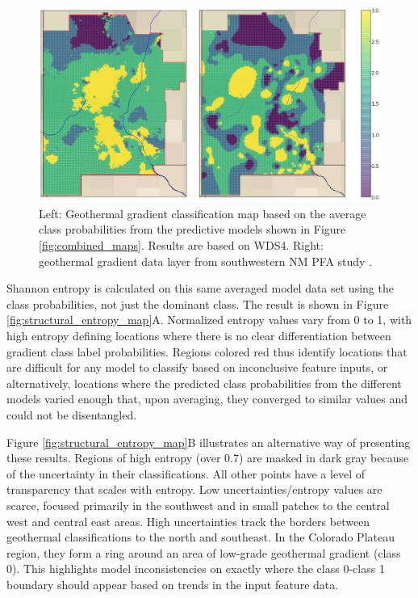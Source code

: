 \begin{figure}[!htp]
\centering
\includegraphics[width=\textwidth]{templates/images/Figure-Average_Gradient_Map_Joint.png}
\caption[Probability-averaged prediction map]{Left: Geothermal gradient classification map based on the average class probabilities from the predictive models shown in Figure \ref{fig:combined_maps}. Results are based on WDS4. Right: geothermal gradient data layer from southwestern NM PFA study \protect\citep{bielicki_hydrogeolgic_2015}.}
\label{fig:avg_final_map}
\end{figure}

Shannon entropy is calculated on this same averaged model data set using the class probabilities, not just the dominant class. The result is shown in Figure \ref{fig:structural_entropy_map}A. Normalized entropy values vary from 0 to 1, with high entropy defining locations where there is no clear differentiation between gradient class label probabilities. Regions colored red thus identify locations that are difficult for any model to classify based on inconclusive feature inputs, or alternatively, locations where the predicted class probabilities from the different models varied enough that, upon averaging, they converged to similar values and could not be disentangled.

Figure \ref{fig:structural_entropy_map}B illustrates an alternative way of presenting these results. Regions of high entropy (over 0.7) are masked in dark gray because of the uncertainty in their classifications. All other points have a level of transparency that scales with entropy. Low uncertainties/entropy values are scarce, focused primarily in the southwest and in small patches to the central west and central east areas. High uncertainties track the borders between geothermal classifications to the north and southeast. In the Colorado Plateau region, they form a ring around an area of low-grade geothermal gradient (class 0). This highlights model inconsistencies on exactly where the class 0-class 1 boundary should appear based on trends in the input feature data.

